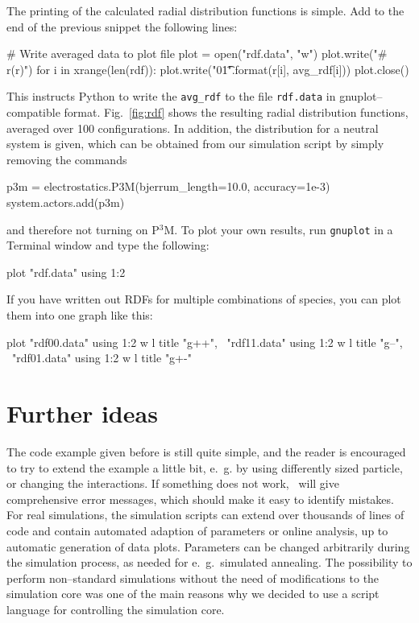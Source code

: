 \documentclass[
a4paper,                        %
11pt,                           %
twoside,                        %
footsepline,                    %
headsepline,                    %
headexclude,                    %
footexclude,                    %
pagesize,                       %
]{scrartcl}
\begin{document}
The printing of the calculated radial distribution functions is
simple. Add to the end of the previous snippet the following lines:

\begin{tclcode}
# Write averaged data to plot file
plot = open("rdf.data", "w")
plot.write("# r\trdf(r)\n")
for i in xrange(len(rdf)):
    plot.write("{0}\t{1}\n".format(r[i], avg_rdf[i]))
plot.close()
\end{tclcode}

This instructs Python to write the \verb|avg_rdf| to the
file \verb|rdf.data| in gnuplot--compatible format. Fig.~\ref{fig:rdf}
shows the resulting radial distribution functions, averaged over 100
configurations. In addition, the distribution for a neutral system is
given, which can be obtained from our simulation script by simply
removing the commands

\begin{tclcode}
    p3m = electrostatics.P3M(bjerrum_length=10.0, accuracy=1e-3)
    system.actors.add(p3m)
\end{tclcode}

and therefore not turning on P$^3$M.
To plot your own results, run \verb|gnuplot| in a Terminal window
and type the following:
\begin{tclcode}
plot "rdf.data" using 1:2	
\end{tclcode}
If you have written out RDFs for multiple combinations of species,
you can plot them into one graph like this:
\begin{tclcode}
plot "rdf00.data" using 1:2 w l title "g++", \
     "rdf11.data" using 1:2 w l title "g--", \
     "rdf01.data" using 1:2 w l title "g+-"	
\end{tclcode}


\section{Further ideas}

The code example given before is still quite simple, and the reader is
encouraged to try to extend the example a little bit, e.~g. by using
differently sized particle, or changing the interactions. If something
does not work, \es\ will give comprehensive error messages, which
should make it easy to identify mistakes. For real simulations, the
simulation scripts can extend over thousands of lines of code and
contain automated adaption of parameters or online analysis, up to
automatic generation of data plots.  Parameters can be changed
arbitrarily during the simulation process, as needed for e.~g.\
simulated annealing. The possibility to perform non--standard
simulations without the need of modifications to the simulation core
was one of the main reasons why we decided to use a script language
for controlling the simulation core.
\end{document}

